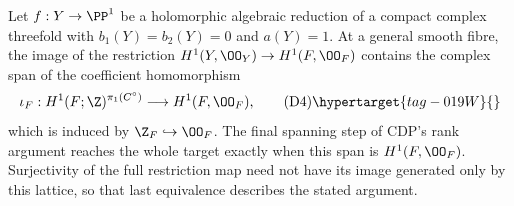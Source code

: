 \begin{proposition}\hypertarget{tag-01FV}{}\label{cdp:st:D.1.10}

Let $f:Y\to\PP^1$ be a holomorphic algebraic reduction of a compact
complex threefold with $b_1(Y)=b_2(Y)=0$ and $a(Y)=1$.
At a general smooth fibre, the image of the restriction
$H^1(Y,\OO_Y)\to H^1(F,\OO_F)$ contains the complex span of
the coefficient homomorphism
\[
\iota_F:H^1(F;\Z)^{\pi_1(C^\circ)}
 \longrightarrow H^1(F,\OO_F),                         \tag{D4}\hypertarget{tag-019W}{}\label{cdp:eq:D4}
\]
which is induced by $\Z_F\hookrightarrow\OO_F$.
The final spanning step of CDP's rank argument reaches the whole
target exactly when this span is $H^1(F,\OO_F)$. Surjectivity of
the full restriction map need not have its image generated only by
this lattice, so that last equivalence describes the stated argument.
\end{proposition}


